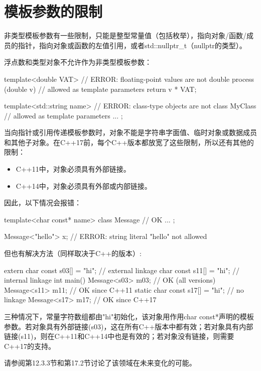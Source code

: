 \section{模板参数的限制}
非类型模板参数有一些限制，只能是整型常量值（包括枚举），指向对象/函数/成员的指针，指向对象或函数的左值引用，或者std::nullptr\_t（nullptr的类型）。

浮点数和类型对象不允许作为非类型模板参数：

\begin{cpp}
template<double VAT> // ERROR: floating-point values are not
double process (double v) // allowed as template parameters
{
	return v * VAT;
}

template<std::string name> // ERROR: class-type objects are not
class MyClass { // allowed as template parameters
	...
};
\end{cpp}

当向指针或引用传递模板参数时，对象不能是字符串字面值、临时对象或数据成员和其他子对象。在C++17前，每个C++版本都放宽了这些限制，所以还有其他的限制：

\begin{itemize}
\item 
C++11中，对象必须具有外部链接。

\item 
C++14中，对象必须具有外部或内部链接。
\end{itemize}

因此，以下情况会报错：

\begin{cpp}
template<char const* name>
class Message { // OK
	...
};

Message<"hello"> x; // ERROR: string literal "hello" not allowed
\end{cpp}

但也有解决方法（同样取决于C++的版本）:

\begin{cpp}
extern char const s03[] = "hi"; // external linkage
char const s11[] = "hi"; // internal linkage
int main()
{
	Message<s03> m03; // OK (all versions)
	Message<s11> m11; // OK since C++11
	static char const s17[] = "hi"; // no linkage
	Message<s17> m17; // OK since C++17
}
\end{cpp}

三种情况下，常量字符数组都由"hi"初始化，该对象用作用char const*声明的模板参数。若对象具有外部链接(s03)，这在所有C++版本中都有效；若对象具有内部链接(s11)，则在C++11和C++14中也是有效的；若对象没有链接，则需要C++17的支持。

请参阅第12.3.3节和第17.2节讨论了该领域在未来变化的可能。


